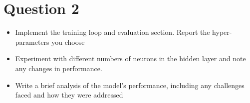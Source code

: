 
\section{Question 2}

\begin{itemize}
    \item  Implement the training loop and evaluation section. Report the hyper-parameters you choose
    
    \item Experiment with different numbers of neurons in the hidden layer and note any changes in performance.
    
    \item Write a brief analysis of the model's performance, including any challenges faced and how they were addressed
\end{itemize}

